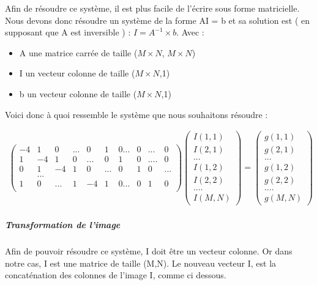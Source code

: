 Afin de résoudre ce système, il est plus facile de l'écrire sous forme matricielle. Nous devons donc résoudre un système de la forme AI = b et sa solution est ( en supposant que A est inversible ) :  $I = A^{-1}\times b$.
Avec : 
\begin{itemize}
\item A une matrice carrée de taille ($M\times N$, $M\times N$)
\item I un vecteur colonne de taille ($M\times N$,1)
\item b un vecteur colonne de taille ($M\times N$,1)
\end{itemize}
Voici donc à quoi ressemble le système que nous souhaitons résoudre :
\begin{center}

\begin{equation}
\left.
\begin{aligned}
\begin{pmatrix}
	-4 & 1 & 0 & ...& 0 & 1 & 0...&0& ... & 0\\
	1 & -4 & 1 & 0 & ... & 0 &1 &0&....&0\\
	0 & 1 & -4 & 1 & 0&... &0 &1 &0&...\\
	&...\\
	1 & 0 &... &1 &-4 &1 &0...& 0& 1 & 0\\
\end{pmatrix}
\begin{pmatrix}
I(1,1)\\
I(2,1)\\
...\\
I(1,2)\\
I(2,2)\\
....\\
I(M, N)
\end{pmatrix}
= 
\begin{pmatrix}
g(1,1)\\
g(2,1)\\
...\\
g(1,2)\\
g(2,2)\\
....\\
g(M, N)
\end{pmatrix}
\end{aligned}
\right.
\end{equation}
\end{center}

\subparagraph{Transformation de l'image}
Afin de pouvoir résoudre ce système, I doit être un vecteur colonne. Or dans notre cas, I est une matrice de taille (M,N). Le nouveau vecteur I, est la concaténation des colonnes de l'image I, comme ci dessous.


